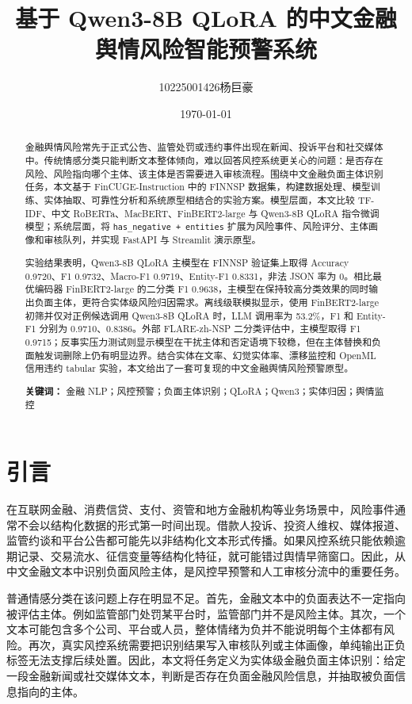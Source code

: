 \documentclass[UTF8,a4paper,12pt]{ctexart}
\title{\heiti 基于 Qwen3-8B QLoRA 的中文金融舆情风险智能预警系统}
\author{10225001426\quad 杨巨豪}
\date{\today}
\begin{document}
\maketitle

\begin{abstract}
金融舆情风险常先于正式公告、监管处罚或违约事件出现在新闻、投诉平台和社交媒体中。传统情感分类只能判断文本整体倾向，难以回答风控系统更关心的问题：是否存在风险、风险指向哪个主体、该主体是否需要进入审核流程。围绕中文金融负面主体识别任务，本文基于 FinCUGE-Instruction 中的 FINNSP 数据集，构建数据处理、模型训练、实体抽取、可靠性分析和系统原型相结合的实验方案。模型层面，本文比较 TF-IDF、中文 RoBERTa、MacBERT、FinBERT2-large 与 Qwen3-8B QLoRA 指令微调模型；系统层面，将 \texttt{has\_negative + entities} 扩展为风险事件、风险评分、主体画像和审核队列，并实现 FastAPI 与 Streamlit 演示原型。

实验结果表明，Qwen3-8B QLoRA 主模型在 FINNSP 验证集上取得 Accuracy 0.9720、F1 0.9732、Macro-F1 0.9719、Entity-F1 0.8331，非法 JSON 率为 0。相比最优编码器 FinBERT2-large 的二分类 F1 0.9638，主模型在保持较高分类效果的同时输出负面主体，更符合实体级风险归因需求。离线级联模拟显示，使用 FinBERT2-large 初筛并仅对正例候选调用 Qwen3-8B QLoRA 时，LLM 调用率为 53.2\%，F1 和 Entity-F1 分别为 0.9710、0.8386。外部 FLARE-zh-NSP 二分类评估中，主模型取得 F1 0.9715；反事实压力测试则显示模型在干扰主体和否定语境下较稳，但在主体替换和负面触发词删除上仍有明显边界。结合实体在文率、幻觉实体率、漂移监控和 OpenML 信用违约 tabular 实验，本文给出了一套可复现的中文金融舆情风险预警原型。

\noindent\textbf{关键词：} 金融 NLP；风控预警；负面主体识别；QLoRA；Qwen3；实体归因；舆情监控
\end{abstract}

\newpage
\tableofcontents
\newpage

\section{引言}

在互联网金融、消费信贷、支付、资管和地方金融机构等业务场景中，风险事件通常不会以结构化数据的形式第一时间出现。借款人投诉、投资人维权、媒体报道、监管约谈和平台公告都可能先以非结构化文本形式传播。如果风控系统只能依赖逾期记录、交易流水、征信变量等结构化特征，就可能错过舆情早筛窗口。因此，从中文金融文本中识别负面风险主体，是风控早预警和人工审核分流中的重要任务。

普通情感分类在该问题上存在明显不足。首先，金融文本中的负面表达不一定指向被评估主体。例如监管部门处罚某平台时，监管部门并不是风险主体。其次，一个文本可能包含多个公司、平台或人员，整体情绪为负并不能说明每个主体都有风险。再次，真实风控系统需要把识别结果写入审核队列或主体画像，单纯输出正负标签无法支撑后续处置。因此，本文将任务定义为实体级金融负面主体识别：给定一段金融新闻或社交媒体文本，判断是否存在负面金融风险信息，并抽取被负面信息指向的主体。
\end{document}
